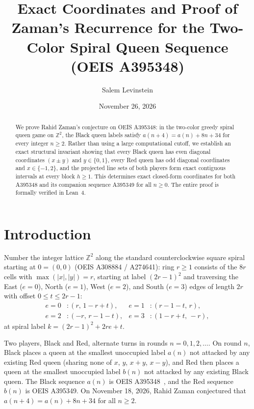 \documentclass[11pt]{article}
\title{Exact Coordinates and Proof of Zaman's Recurrence for the Two-Color Spiral Queen Sequence (OEIS A395348)}
\author{Salem Levinstein}
\date{November 26, 2026}
\begin{document}
\maketitle

\begin{abstract}
We prove Rahid Zaman's conjecture on OEIS A395348: in the two-color greedy spiral queen game on $\mathbb{Z}^2$, the Black queen labels satisfy $a(n + 4) = a(n) + 8n + 34$ for every integer $n \ge 2$. Rather than using a large computational cutoff, we establish an exact structural invariant showing that every Black queen has even diagonal coordinates $(x \pm y)$ and $y \in \{0, 1\}$, every Red queen has odd diagonal coordinates and $x \in \{-1, 2\}$, and the projected line sets of both players form exact contiguous intervals at every block $h \ge 1$. This determines exact closed-form coordinates for both A395348 and its companion sequence A395349 for all $n \ge 0$. The entire proof is formally verified in Lean~4.
\end{abstract}

\section{Introduction}

Number the integer lattice $\mathbb{Z}^2$ along the standard counterclockwise square spiral starting at $0 = (0, 0)$ (OEIS A308884 / A274641): ring $r \ge 1$ consists of the $8r$ cells with $\max(|x|, |y|) = r$, starting at label $(2r - 1)^2$ and traversing the East ($e = 0$), North ($e = 1$), West ($e = 2$), and South ($e = 3$) edges of length $2r$ with offset $0 \le t \le 2r - 1$:
\begin{align*}
  e = 0 &: (r,\, 1 - r + t), &
  e = 1 &: (r - 1 - t,\, r), \\
  e = 2 &: (-r,\, r - 1 - t), &
  e = 3 &: (1 - r + t,\, -r),
\end{align*}
at spiral label $k = (2r - 1)^2 + 2re + t$.

Two players, Black and Red, alternate turns in rounds $n = 0, 1, 2, \dots$. On round $n$, Black places a queen at the smallest unoccupied label $a(n)$ not attacked by any existing Red queen (sharing none of $x$, $y$, $x + y$, $x - y$), and Red then places a queen at the smallest unoccupied label $b(n)$ not attacked by any existing Black queen. The Black sequence $a(n)$ is OEIS A395348~\cite{OEIS-A395348}, and the Red sequence $b(n)$ is OEIS A395349. On November 18, 2026, Rahid Zaman conjectured that $a(n + 4) = a(n) + 8n + 34$ for all $n \ge 2$.
\end{document}
